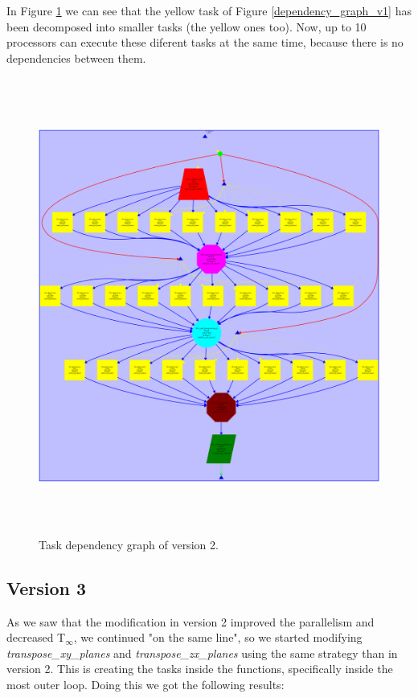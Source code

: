 \documentclass[12pt, a4paper]{article}
\begin{document}
In Figure \ref{dependency_graph_v2} we can see that the yellow task of Figure \ref{dependency_graph_v1} has been decomposed into smaller tasks (the yellow ones too). Now, up to 10 processors can execute these diferent tasks at the same time, because there is no dependencies between them.

\begin{figure}[H]
  \centering
  \includegraphics[width=15cm,height=15cm]{./images/dependency_graph_v2}
  \caption{Task dependency graph of version 2.}
  \label{dependency_graph_v2}
\end{figure}


\subsection{Version 3}

As we saw that the modification in version 2 improved the parallelism and decreased T$_\infty$, we continued "on the same line", so we started modifying \textit{transpose\_xy\_planes} and \textit{transpose\_zx\_planes} using the same strategy than in version 2. This is creating the tasks inside the functions, specifically inside the most outer loop. Doing this we got the following results:
\end{document}
